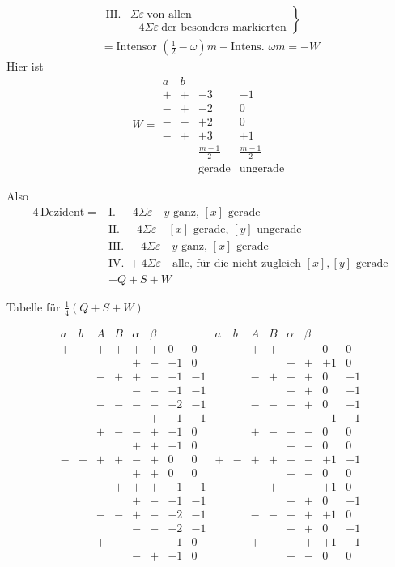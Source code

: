 \[
\begin{gathered}
\left.\begin{array}{rl}
\mathrm{III.}&\Sigma\varepsilon\ \text{von allen}\\
&-4\Sigma\varepsilon\ \text{der besonders markierten}
\end{array}\right\}\\
={}\text{Intensor }(\tfrac12-\omega)m-\text{Intens. }\omega m=-W
\end{gathered}
\]
Hier ist
\[
W=\begin{array}{cc|rr}
a&b&&\\
+&+&-3&-1\\
-&+&-2&0\\
-&-&+2&0\\
-&+&+3&+1\\[3pt]
&&\frac{m-1}{2}&\frac{m-1}{2}\\
&&\text{gerade}&\text{ungerade}
\end{array}
\]

Also
\[
\begin{aligned}
4\,\text{Dezident}={}&\text{I.}\;-4\Sigma\varepsilon\quad y\text{ ganz, }[x]\text{ gerade}\\
&\text{II.}\;+4\Sigma\varepsilon\quad[x]\text{ gerade, }[y]\text{ ungerade}\\
&\text{III.}\;-4\Sigma\varepsilon\quad y\text{ ganz, }[x]\text{ gerade}\\
&\text{IV.}\;+4\Sigma\varepsilon\quad\text{alle, für die nicht zugleich }[x],[y]\text{ gerade}\\
&+Q+S+W
\end{aligned}
\]

\begin{center}Tabelle für $\frac14(Q+S+W)$\end{center}
\begingroup\small\setlength{\arraycolsep}{2pt}
\[
\begin{array}{cccccc|rr||cccccc|rr}
a&b&A&B&\alpha&\beta&&&a&b&A&B&\alpha&\beta&&\\
+&+&+&+&+&+&0&0&-&-&+&+&-&-&0&0\\
&&&&+&-&-1&0&&&&&-&+&+1&0\\
&&-&+&+&-&-1&-1&&&-&+&-&+&0&-1\\
&&&&-&-&-1&-1&&&&&+&+&0&-1\\
&&-&-&-&-&-2&-1&&&-&-&+&+&0&-1\\
&&&&-&+&-1&-1&&&&&+&-&-1&-1\\
&&+&-&-&+&-1&0&&&+&-&+&-&0&0\\
&&&&+&+&-1&0&&&&&-&-&0&0\\[3pt]
-&+&+&+&-&+&0&0&+&-&+&+&+&-&+1&+1\\
&&&&+&+&0&0&&&&&-&-&0&0\\
&&-&+&+&+&-1&-1&&&-&+&-&-&+1&0\\
&&&&+&-&-1&-1&&&&&-&+&0&-1\\
&&-&-&+&-&-2&-1&&&-&-&-&+&+1&0\\
&&&&-&-&-2&-1&&&&&+&+&0&-1\\
&&+&-&-&-&-1&0&&&+&-&+&+&+1&+1\\
&&&&-&+&-1&0&&&&&+&-&0&0\\
\end{array}
\]
\endgroup

